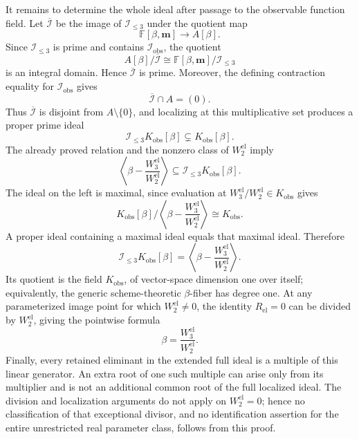 It remains to determine the whole ideal after passage to the observable function field.  Let \(\overline{\mathcal I}\) be the image of \(\mathcal I_{\leq3}\) under the quotient map
\[
\mathbb F[\beta,\mathbf m]\longrightarrow A[\beta].
\]
Since \(\mathcal I_{\leq3}\) is prime and contains \(\mathcal I_{\mathrm{obs}}\), the quotient
\[
A[\beta]/\overline{\mathcal I}
\cong
\mathbb F[\beta,\mathbf m]/\mathcal I_{\leq3}
\]
is an integral domain.  Hence \(\overline{\mathcal I}\) is prime.  Moreover, the defining contraction equality for \(\mathcal I_{\mathrm{obs}}\) gives
\[
\overline{\mathcal I}\cap A=(0).
\]
Thus \(\overline{\mathcal I}\) is disjoint from \(A\setminus\{0\}\), and localizing at this multiplicative set produces a proper prime ideal
\[
\mathcal I_{\leq3}K_{\mathrm{obs}}[\beta]
\subsetneq K_{\mathrm{obs}}[\beta].
\]
The already proved relation and the nonzero class of \(W_2^{\mathrm{el}}\) imply
\[
\left\langle
\beta-\frac{W_3^{\mathrm{el}}}{W_2^{\mathrm{el}}}
\right\rangle
\subseteq
\mathcal I_{\leq3}K_{\mathrm{obs}}[\beta].
\]
The ideal on the left is maximal, since evaluation at \(W_3^{\mathrm{el}}/W_2^{\mathrm{el}}\in K_{\mathrm{obs}}\) gives
\[
K_{\mathrm{obs}}[\beta]
\bigg/
\left\langle
\beta-\frac{W_3^{\mathrm{el}}}{W_2^{\mathrm{el}}}
\right\rangle
\cong K_{\mathrm{obs}}.
\]
A proper ideal containing a maximal ideal equals that maximal ideal.  Therefore
\[
\mathcal I_{\leq3}K_{\mathrm{obs}}[\beta]
=
\left\langle
\beta-\frac{W_3^{\mathrm{el}}}{W_2^{\mathrm{el}}}
\right\rangle.
\]
Its quotient is the field \(K_{\mathrm{obs}}\), of vector-space dimension one over itself; equivalently, the generic scheme-theoretic \(\beta\)-fiber has degree one.  At any parameterized image point for which \(W_2^{\mathrm{el}}\ne0\), the identity \(R_{\mathrm{el}}=0\) can be divided by \(W_2^{\mathrm{el}}\), giving the pointwise formula
\[
\beta=\frac{W_3^{\mathrm{el}}}{W_2^{\mathrm{el}}}.
\]
Finally, every retained eliminant in the extended full ideal is a multiple of this linear generator.  An extra root of one such multiple can arise only from its multiplier and is not an additional common root of the full localized ideal.  The division and localization arguments do not apply on \(W_2^{\mathrm{el}}=0\); hence no classification of that exceptional divisor, and no identification assertion for the entire unrestricted real parameter class, follows from this proof.
